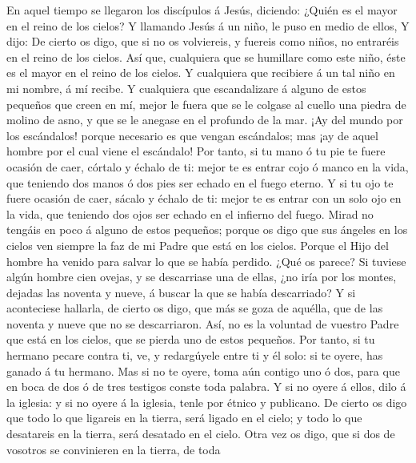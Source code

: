  En aquel tiempo se llegaron los discípulos á Jesús,
diciendo: ¿Quién es el mayor en el reino de los cielos?  Y
llamando Jesús á un niño, le puso en medio de ellos,  Y
dijo: De cierto os digo, que si no os volviereis, y fuereis como niños,
no entraréis en el reino de los cielos.  Así que,
cualquiera que se humillare como este niño, éste es el mayor en el reino
de los cielos.  Y cualquiera que recibiere á un tal niño
en mi nombre, á mí recibe.  Y cualquiera que escandalizare
á alguno de estos pequeños que creen en mí, mejor le fuera que se le
colgase al cuello una piedra de molino de asno, y que se le anegase en
el profundo de la mar.  ¡Ay del mundo por los escándalos!
porque necesario es que vengan escándalos; mas ¡ay de aquel hombre por
el cual viene el escándalo!  Por tanto, si tu mano ó tu
pie te fuere ocasión de caer, córtalo y échalo de ti: mejor te es entrar
cojo ó manco en la vida, que teniendo dos manos ó dos pies ser echado en
el fuego eterno.  Y si tu ojo te fuere ocasión de caer,
sácalo y échalo de ti: mejor te es entrar con un solo ojo en la vida,
que teniendo dos ojos ser echado en el infierno del fuego.
 Mirad no tengáis en poco á alguno de estos pequeños;
porque os digo que sus ángeles en los cielos ven siempre la faz de mi
Padre que está en los cielos.  Porque el Hijo del hombre
ha venido para salvar lo que se había perdido.  ¿Qué os
parece? Si tuviese algún hombre cien ovejas, y se descarriase una de
ellas, ¿no iría por los montes, dejadas las noventa y nueve, á buscar la
que se había descarriado?  Y si aconteciese hallarla, de
cierto os digo, que más se goza de aquélla, que de las noventa y nueve
que no se descarriaron.  Así, no es la voluntad de
vuestro Padre que está en los cielos, que se pierda uno de estos
pequeños.  Por tanto, si tu hermano pecare contra ti, ve,
y redargúyele entre ti y él solo: si te oyere, has ganado á tu hermano.
 Mas si no te oyere, toma aún contigo uno ó dos, para que
en boca de dos ó de tres testigos conste toda palabra.  Y
si no oyere á ellos, dilo á la iglesia: y si no oyere á la iglesia,
tenle por étnico y publicano.  De cierto os digo que todo
lo que ligareis en la tierra, será ligado en el cielo; y todo lo que
desatareis en la tierra, será desatado en el cielo.  Otra
vez os digo, que si dos de vosotros se convinieren en la tierra, de toda
